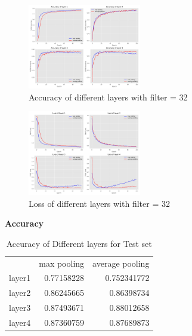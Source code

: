 \documentclass{article}
\begin{document}
\begin{figure}[H] %
	\centering %
	\includegraphics[width=0.44\textwidth]{./pic/part2/filter32_max_average_layer_acc.pdf} %
	\caption{Accuracy of different layers with filter = 32} %
	\label{Fig.main2} %
\end{figure}

\begin{figure}[H] %
	\centering %
	\includegraphics[width=0.44\textwidth]{./pic/part2/filter32_max_average_layer_loss.pdf} %
	\caption{Loss of different layers with filter = 32} %
	\label{Fig.main2} %
\end{figure}

\textbf{Accuracy}

\begin{table}[htbp]
  \centering
  \caption{Accuracy of Different layers for Test set}
    \begin{tabular}{lrr}
          & \multicolumn{1}{l}{max pooling} & \multicolumn{1}{l}{average pooling} \\
    layer1 & 0.77158228 & 0.752341772 \\
    layer2 & 0.86245665 & 0.86398734 \\
    layer3 & 0.87493671 & 0.88012658 \\
    layer4 & 0.87360759 & 0.87689873 \\
    \end{tabular}%
  \label{tab:addlabel}%
\end{table}%
\end{document}
